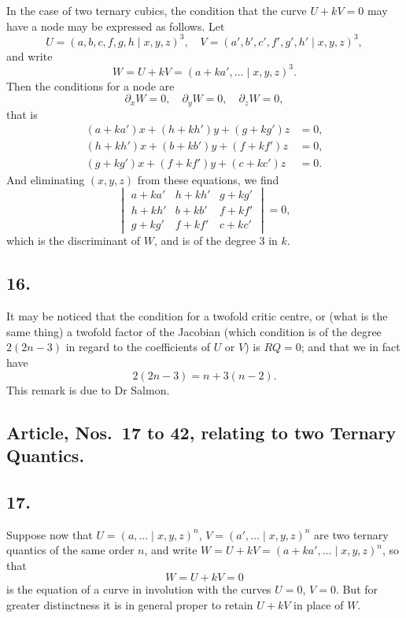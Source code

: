 \documentclass[11pt,a4paper]{article}
\theoremstyle{definition}
\begin{document}
In the case of two ternary cubics, the condition that the curve $U + kV = 0$ may have
a node may be expressed as follows. Let
\[
U = (a, b, c, f, g, h \mid x, y, z)^{3},\quad V = (a', b', c', f', g', h' \mid x, y, z)^{3},
\]
and write
\[
W = U + kV = (a + ka', \ldots \mid x, y, z)^{3}.
\]
Then the conditions for a node are
\[
\partial_{x}W = 0,\quad \partial_{y}W = 0,\quad \partial_{z}W = 0,
\]
that is
\begin{align*}
(a + ka')x + (h + kh')y + (g + kg')z &= 0,\\
(h + kh')x + (b + kb')y + (f + kf')z &= 0,\\
(g + kg')x + (f + kf')y + (c + kc')z &= 0.
\end{align*}
And eliminating $(x, y, z)$ from these equations, we find
\[
\begin{vmatrix}
a + ka' & h + kh' & g + kg' \\
h + kh' & b + kb' & f + kf' \\
g + kg' & f + kf' & c + kc'
\end{vmatrix}
= 0,
\]
which is the discriminant of $W$, and is of the degree 3 in $k$.

\subsection*{16.}

It may be noticed that the condition for a twofold critic centre, or (what is the same
thing) a twofold factor of the Jacobian (which condition is of the degree $2(2n - 3)$ in regard
to the coefficients of $U$ or $V$) is $RQ = 0$; and that we in fact have
\[
2(2n - 3) = n + 3(n - 2).
\]
This remark is due to Dr Salmon.

\newpage
\subsection*{Article, Nos.\ 17 to 42, relating to two Ternary Quantics.}

\subsection*{17.}

Suppose now that $U = (a, \ldots \mid x, y, z)^{n}$, $V = (a', \ldots \mid x, y, z)^{n}$ are two ternary
quantics of the same order $n$, and write $W = U + kV = (a + ka', \ldots \mid x, y, z)^{n}$, so that
\[
W = U + kV = 0
\]
is the equation of a curve in involution with the curves $U = 0$, $V = 0$. But for
greater distinctness it is in general proper to retain $U + kV$ in place of $W$.
\end{document}
